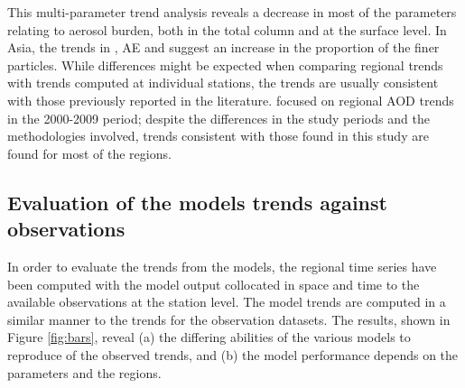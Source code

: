 \documentclass[acp, manuscript]{copernicus}
\begin{document}
This multi-parameter trend analysis reveals a decrease in most of the parameters relating to aerosol burden, both in the total column and at the surface level. In Asia, the trends in , AE and  suggest an increase in the proportion of the finer particles. While differences might be expected when comparing regional trends with trends computed at individual stations, the trends are usually consistent with those previously reported in the literature.  \cite{DEMEIJ201275} focused on regional AOD trends in the 2000-2009 period; despite the differences in the study periods and the methodologies involved, trends consistent with those found in this study are found for most of the regions.

\subsection{Evaluation of the models trends against observations}\label{mod_evaluation}


In order to evaluate the trends from the models, the regional time series have been computed with the model output collocated in space and time to the available observations at the station level. The model trends are computed in a similar manner to the trends for the observation datasets. The results, shown in Figure \ref{fig:bars}, reveal (a) the differing abilities of the various models to reproduce of the observed trends, and (b) the model performance depends on the parameters and the regions.
\end{document}
